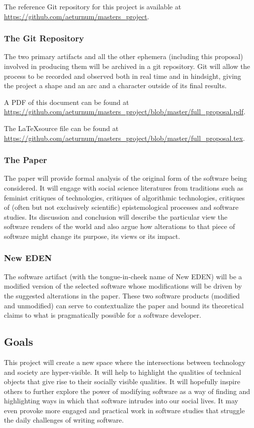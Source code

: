 \documentclass[a4paper,man,natbib]{apa6}
\begin{document}
   The reference Git repository for this project is available at \url{https://github.com/aeturnum/masters_project}.
   \subsubsection*{The Git Repository}
   The two primary artifacts and all the other ephemera (including this proposal) involved in producing them will be archived in a git repository. Git will allow the process to be recorded and observed both in real time and in hindsight, giving the project a shape and an arc and a character outside of its final results. 

   A PDF of this document can be found at \url{https://github.com/aeturnum/masters_project/blob/master/full_proposal.pdf}.

   The \LaTeX source file can be found at \url{https://github.com/aeturnum/masters_project/blob/master/full_proposal.tex}.

   \subsubsection*{The Paper}
   The paper will provide formal analysis of the original form of the software being considered. It will engage with social science literatures from traditions such as feminist critiques of technologies, critiques of algorithmic technologies, critiques of (often but not exclusively scientific) epistemological processes and software studies. Its discussion and conclusion will describe the particular view the software renders of the world and also argue how alterations to that piece of software might change its purpose, its views or its impact.

   \subsubsection*{New EDEN}
   The software artifact (with the tongue-in-cheek name of New \acrshort{EDEN}) will be a modified version of the selected software whose modifications will be driven by the suggested alterations in the paper. These two software products (modified and unmodified) can serve to contextualize the paper and bound its theoretical claims to what is pragmatically possible for a software developer.

   \subsection*{Goals}
   This project will create a new space where the intersections between technology and society are hyper-visible. It will help to highlight the qualities of technical objects that give rise to their socially visible qualities. It will hopefully inspire others to further explore the power of modifying software as a way of finding and highlighting ways in which that software intrudes into our social lives. It may even provoke more engaged and practical work in software studies that struggle the daily challenges of writing software.

   \newpage
   \printnoidxglossaries

   \newpage
   \setlength{\parindent}{4em}
   
\end{document}
